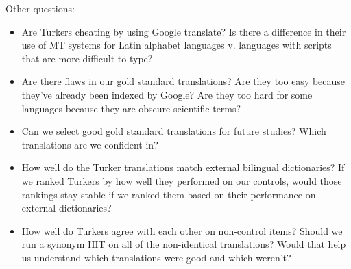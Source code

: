 \documentclass[11pt]{article}
\begin{document}
Other questions:
\begin{itemize}
\item Are Turkers cheating by using Google translate?  Is there a difference in their use of MT systems for Latin alphabet languages v. languages with scripts that are more difficult to type?
\item Are there flaws in our gold standard translations?  Are they too easy because they've already been indexed by Google?  Are they too hard for some languages because they are obscure scientific terms?
\item Can we select good gold standard translations for future studies?  Which translations are we confident in?
\item How well do the Turker translations match external bilingual dictionaries?  If we ranked Turkers by how well they performed on our controls, would those rankings stay stable if we ranked them based on their performance on external dictionaries? 
\item How well do Turkers agree with each other on non-control items?  Should we run a synonym HIT on all of the non-identical translations?  Would that help us understand which translations were good and which weren't?  
\end{itemize}



\end{document}
